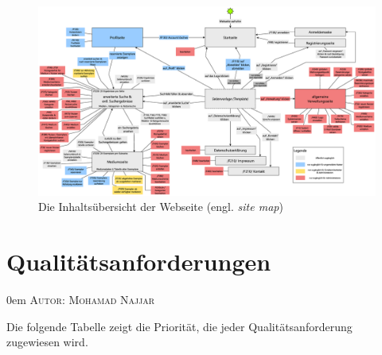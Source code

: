\documentclass{article}
\makeatletter
\newcommand{\sectionauthor}[1]{
	{\parindent 0em \large \scshape Autor: #1 \par \nobreak \vspace*{2em}}
	\@afterheading
}
\makeatother
\begin{document}
\newpage
{}

\begin{figure}[h]
    \centering
    \includegraphics[angle = 270, width = 40em]{site_map}
    \caption{Die Inhaltsübersicht der Webseite (engl. \textit{site map})}
    \label{site_map}
\end{figure}

\restoregeometry

\section{Qualitätsanforderungen} %
\sectionauthor{Mohamad Najjar}

Die folgende Tabelle zeigt die Priorität, die jeder Qualitätsanforderung zugewiesen wird.
	
\end{document}
